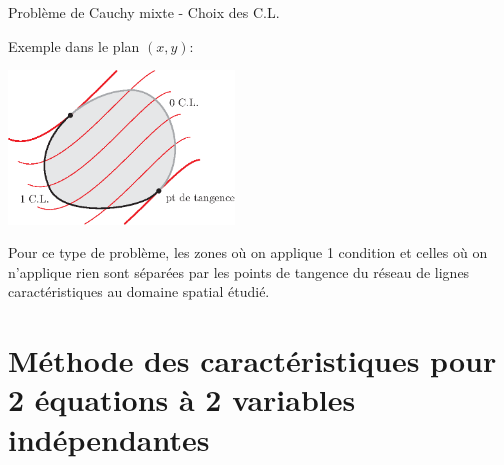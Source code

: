 \documentclass[
mode=present,    %
paper=a4paper,   %
orient=landscape,
display=slides,   %
size=10pt,
style=romain   %
]{powerdot}
\begin{document}
\begin{slide}[toc=]{Problème de Cauchy mixte - Choix des C.L.}

Exemple dans le plan $(x,y)$:

    \centerline{\includegraphics[width=0.45\textwidth]{domqcq1d.eps} }

\bigskip

Pour ce type de problème, les zones où on applique 1 condition et celles où on n'applique rien sont séparées par les points de tangence du réseau de lignes caractéristiques au domaine spatial étudié.

\end{slide}


\section[toc=Carac. 2D - 2equ.]{Méthode des caractéristiques pour 2 équations à 2 variables indépendantes}
\end{document}
